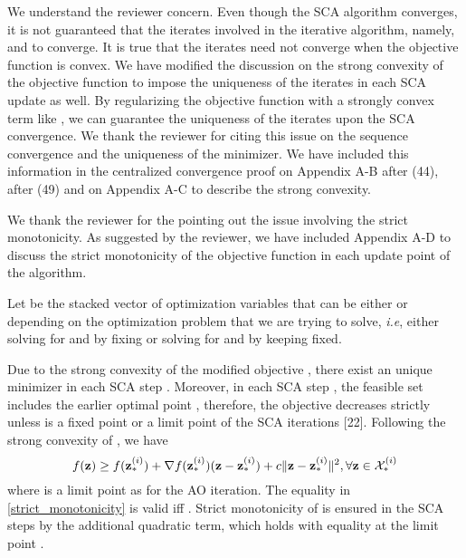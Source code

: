 \begin{enumerate}
\resp We understand the reviewer concern. Even though the \ac{SCA} algorithm converges, it is not guaranteed that the iterates involved in the iterative algorithm, namely,  and  to converge. It is true that the iterates need not converge when the objective function is convex. We have modified the discussion on the strong convexity of the objective function to impose the uniqueness of the iterates in each \ac{SCA} update as well. By regularizing the objective function with a strongly convex term like , we can guarantee the uniqueness of the iterates upon the \ac{SCA} convergence. We thank the reviewer for citing this issue on the sequence convergence and the uniqueness of the minimizer. We have included this information in the centralized convergence proof on Appendix A-B after (44), after (49) and on Appendix A-C to describe the strong convexity.

  

\resp We thank the reviewer for the pointing out the issue involving the strict monotonicity. As suggested by the reviewer, we have included Appendix A-D to discuss the strict monotonicity of the objective function in each update point of the algorithm. 

Let  be the stacked vector of optimization variables that can be either  or  depending on the optimization problem that we are trying to solve, \textit{i.e}, either solving for \eqn{\mx} and \eqn{\mz} by fixing  or solving for \eqn{\my} and \eqn{\mz} by keeping  fixed. 

Due to the strong convexity of the modified objective , there exist an unique minimizer in each \ac{SCA} step . Moreover, in each \ac{SCA} step , the feasible set  includes the earlier optimal point , therefore, the objective decreases strictly unless  is a fixed point or a limit point of the \ac{SCA} iterations [22]. Following the strong convexity of , we have
\begin{equation} \label{strict_monotonicity}
f(\mathbf{z}) \geq f(\mathbf{z}_{\ast}^{(i)}) + \nabla f(\mathbf{z}_{\ast}^{(i)}) (\mathbf{z} - \mathbf{z}_{\ast}^{(i)}) + c \|\mathbf{z} - \mathbf{z}_{\ast}^{(i)}\|^2, \forall \mathbf{z}\in \mathcal{X}^{(i)}_\ast
\end{equation}
where  is a limit point as  for the  \ac{AO} iteration. The equality in \eqref{strict_monotonicity} is valid iff . Strict monotonicity of  is ensured in the \ac{SCA} steps by the additional quadratic term, which holds with equality at the limit point .


\end{enumerate}
